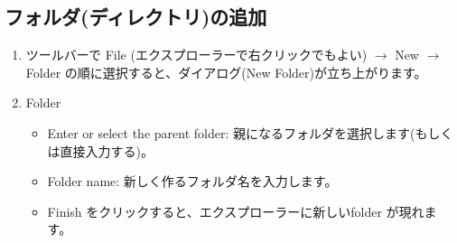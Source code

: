 \subsection{フォルダ(ディレクトリ)の追加}
\begin{enumerate}
\item ツールバーで \colorbox[gray]{0.8}{File} (エクスプローラーで右クリックでもよい) $\rightarrow$ 
\colorbox[gray]{0.8}{New} $\rightarrow$ \colorbox[gray]{0.8}{Folder}
の順に選択すると、ダイアログ(New Folder)が立ち上がります。
\item Folder
\begin{itemize}
\item Enter or select the parent folder: 親になるフォルダを選択します(もしくは直接入力する)。
\item Folder name: 新しく作るフォルダ名を入力します。
\item Finish をクリックすると、エクスプローラーに新しいfolder が現れます。
\end{itemize}
\end{enumerate}
